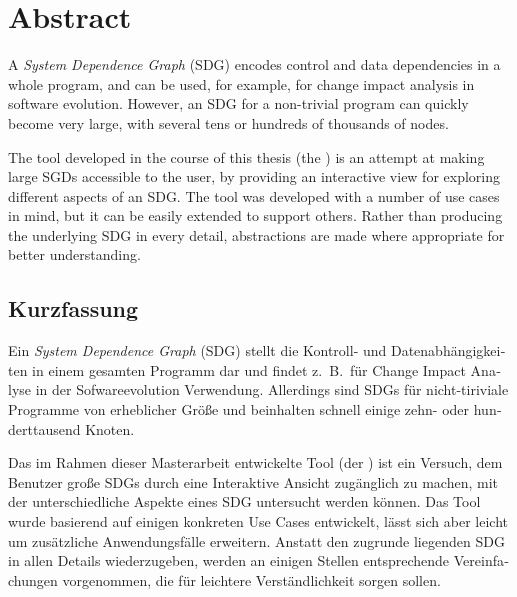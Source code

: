 \chapter*{Abstract} \vspace{-0.5cm}

A \emph{System Dependence Graph} (SDG) encodes control and data dependencies in a whole program, and can be used, for 
example, for change impact analysis in software evolution. However, an SDG for a non-trivial program can quickly become 
very large, with several tens or hundreds of thousands of nodes.

The tool developed in the course of this thesis (the \emph{\SB}) is an attempt at making large SGDs accessible to the 
user, by providing an interactive view for exploring different aspects of an SDG. The tool was developed with a number 
of use cases in mind, but it can be easily extended to support others. Rather than producing the underlying SDG in 
every detail, abstractions are made where appropriate for better understanding.


\begin{otherlanguage}{ngerman}
\begingroup
\let\clearpage\relax
\chapter*{Kurzfassung} \vspace{-0.5cm}
\endgroup

Ein \emph{System Dependence Graph} (SDG) stellt die Kontroll- und Datenabhängigkeiten in einem gesamten Programm dar 
und findet z.\ B.\ für Change Impact Analyse in der Sofwareevolution Verwendung. Allerdings sind SDGs für 
nicht-tiriviale Programme von erheblicher Größe und beinhalten schnell einige zehn- oder hunderttausend Knoten.

Das im Rahmen dieser Masterarbeit entwickelte Tool (der \emph{\SB}) ist ein Versuch, dem Benutzer große SDGs durch eine 
Interaktive Ansicht zugänglich zu machen, mit der unterschiedliche Aspekte eines SDG untersucht werden können. Das Tool 
wurde basierend auf einigen konkreten Use Cases entwickelt, lässt sich aber leicht um zusätzliche Anwendungsfälle 
erweitern. Anstatt den zugrunde liegenden SDG in allen Details wiederzugeben, werden an einigen Stellen entsprechende 
Vereinfachungen vorgenommen, die für leichtere Verständlichkeit sorgen sollen.

\end{otherlanguage}
